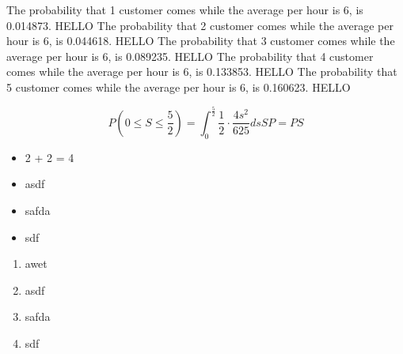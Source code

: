 \documentclass[12pt]{article}
\begin{document}
    
    The probability that 1 customer comes while the average per hour is 6, is 0.014873.
    HELLO
    The probability that 2 customer comes while the average per hour is 6, is 0.044618.
    HELLO
    The probability that 3 customer comes while the average per hour is 6, is 0.089235.
    HELLO
    The probability that 4 customer comes while the average per hour is 6, is 0.133853.
    HELLO
    The probability that 5 customer comes while the average per hour is 6, is 0.160623.
    HELLO

    
    \[
        P(0 \leq S \leq \frac{5}{2}) = \int_{0}^{\frac{5}{2}} \frac{1}{2} \cdot \frac{{4s^2}}{625} ds
        
        SP = PS
    \]
    \begin{itemize}
        \item 2 + 2 = 4
        \item asdf
        \item safda
        \item sdf
    \end{itemize}
    
    \begin{enumerate}
        \item awet
        \item asdf
        \item safda
        \item sdf
    \end{enumerate}
\end{document}
